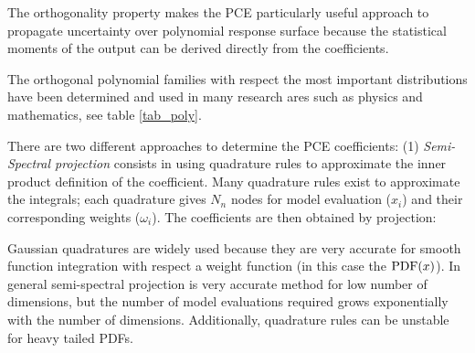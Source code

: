 \documentclass[preprint,12pt]{elsarticle}
\begin{document}

The orthogonality property makes the PCE particularly useful approach to propagate uncertainty over polynomial response surface because the statistical moments of the output can be derived directly from the coefficients.




The orthogonal polynomial families with respect the most important distributions have been determined and used in many research ares such as physics and mathematics, see table \ref{tab_poly}.

\begin{table}[h!]
\begin{center}
\end{center}
\caption{Classical orthogonal polynomial families.}
\label{tab_poly}
\end{table}

There are two different approaches to determine the PCE coefficients: (1) \emph{Semi-Spectral projection} consists in using quadrature rules to approximate the inner product definition of the coefficient. Many quadrature rules exist to approximate the integrals; each quadrature gives $N_n$ nodes for model evaluation ($x_i$) and their corresponding weights ($\omega_i$). The coefficients are then obtained by projection:


Gaussian quadratures are widely used because they are very accurate for smooth function integration with respect a weight function (in this case the $\mathrm{PDF}(x)$). In general semi-spectral projection is very accurate method for low number of dimensions, but the number of model evaluations required grows exponentially with the number of dimensions. Additionally, quadrature rules can be unstable for heavy tailed PDFs.
\end{document}
